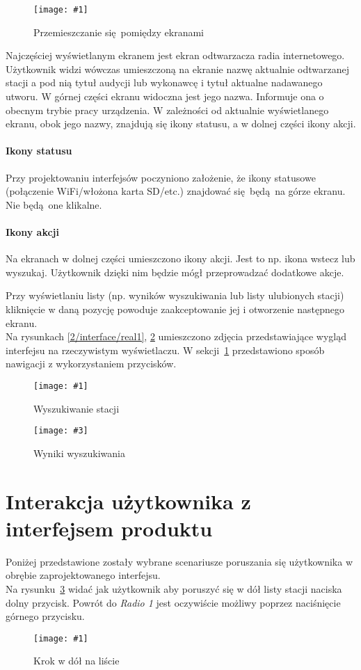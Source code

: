 \documentclass[polish]{aghengthesis}
\newcommand{\imgint}[4]{
	\begin{figure}[{#4}]
		\centering
		\texttt{[image: \#1]}
		\caption{#2}
		\label{#1}
	\end{figure}
}
\newcommand{\imgh}[3]{\imgint{#1}{#2}{#3}{H}}
\newcommand{\imgintss}[5]{
	\begin{figure}[{#5}]
		\centering
		\begin{minipage}{.45\textwidth}
			\centering
			\texttt{[image: \#1]}
			\caption{#2}
			\label{#1}
		\end{minipage}%
		\hfill
		\begin{minipage}{.45\textwidth}
			\centering
			\texttt{[image: \#3]}
			\caption{#4}
			\label{#3}
		\end{minipage}
	\end{figure}
}
\newcommand{\imghss}[4]{\imgintss{#1}{#2}{#3}{#4}{H}}
\begin{document}
		\imgh{2/interface/all}{Przemieszczanie się pomiędzy ekranami}{0.9}
		
		Najczęściej wyświetlanym ekranem jest ekran odtwarzacza radia internetowego. Użytkownik widzi wówczas umieszczoną na ekranie nazwę aktualnie odtwarzanej stacji a pod nią tytuł audycji lub wykonawcę i tytuł aktualne nadawanego utworu.
		W górnej części ekranu widoczna jest jego nazwa. Informuje ona o obecnym trybie pracy urządzenia.
		W zależności od aktualnie wyświetlanego ekranu, obok jego nazwy, znajdują się ikony statusu, a w dolnej części ikony akcji.
		
		\paragraph{Ikony statusu}
			Przy projektowaniu interfejsów poczyniono założenie, że ikony statusowe (połączenie WiFi/włożona karta SD/etc.) znajdować się będą na górze ekranu. Nie będą one klikalne.
			
		\paragraph{Ikony akcji}
			Na ekranach w dolnej części umieszczono ikony akcji. Jest to np. ikona wstecz lub wyszukaj. Użytkownik dzięki nim będzie mógł przeprowadzać dodatkowe akcje.
		
		$ $\\
		Przy wyświetlaniu listy (np. wyników wyszukiwania lub listy ulubionych stacji) kliknięcie w daną pozycję powoduje zaakceptowanie jej i otworzenie następnego ekranu.
		$ $\\
		
		Na rysunkach \ref{2/interface/real1}, \ref{2/interface/real2} umieszczono zdjęcia przedstawiające wygląd interfejsu na rzeczywistym wyświetlaczu. W sekcji~\ref{sec:uinav} przedstawiono sposób nawigacji z wykorzystaniem przycisków.
		\imghss{2/interface/real1}{Wyszukiwanie stacji}{2/interface/real2}{Wyniki wyszukiwania}
	
	\section{Interakcja użytkownika z interfejsem produktu}
		\label{sec:uinav}
		Poniżej przedstawione zostały wybrane scenariusze poruszania się użytkownika w obrębie zaprojektowanego interfejsu.
		$ $\\
		
		Na rysunku~\ref{2/btn/1} widać jak użytkownik aby poruszyć się w dół listy stacji naciska dolny przycisk. Powrót do \textit{Radio 1} jest oczywiście możliwy poprzez naciśnięcie górnego przycisku.
		\imgh{2/btn/1}{Krok w dół na liście}{0.7}
		
\end{document}
